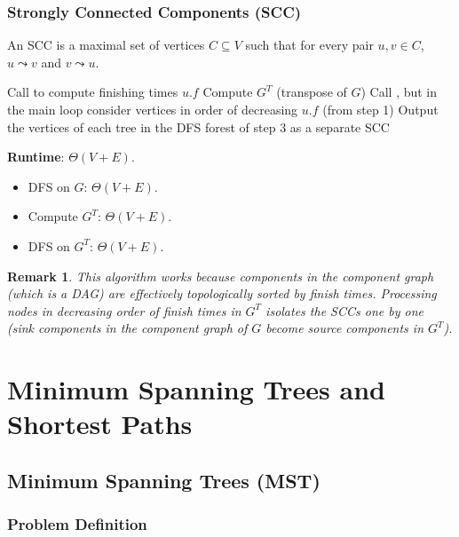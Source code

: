 \documentclass[12pt]{article}
\theoremstyle{blueplain}
\theoremstyle{bluedef}
\theoremstyle{blueremark}
\newtheorem{remark}{Remark}[section]
\begin{document}
\subsubsection{Strongly Connected Components (SCC)}
An SCC is a maximal set of vertices $C \subseteq V$ such that for every pair $u, v \in C$, $u \leadsto v$ and $v \leadsto u$.

\begin{algorithm}
    \caption{SCC Algorithm (Kosaraju)}\label{alg:scc}
    \begin{algorithmic}[1]
        \State Call  to compute finishing times $u.f$
        \State Compute $G^T$ (transpose of $G$)
        \State Call , but in the main loop consider vertices in order of decreasing $u.f$ (from step 1)
        \State Output the vertices of each tree in the DFS forest of step 3 as a separate SCC
        \EndProcedure
    \end{algorithmic}
\end{algorithm}

\textbf{Runtime}: $\Theta(V + E)$.
\begin{itemize}
    \item DFS on $G$: $\Theta(V + E)$.
    \item Compute $G^T$: $\Theta(V + E)$.
    \item DFS on $G^T$: $\Theta(V + E)$.
\end{itemize}

\begin{remark}
    This algorithm works because components in the component graph (which is a DAG) are effectively topologically sorted by finish times. Processing nodes in decreasing order of finish times in $G^T$ isolates the SCCs one by one (sink components in the component graph of $G$ become source components in $G^T$).
\end{remark}

\clearpage


\section{Minimum Spanning Trees and Shortest Paths}

\subsection{Minimum Spanning Trees (MST)}

\subsubsection{Problem Definition}
\end{document}
